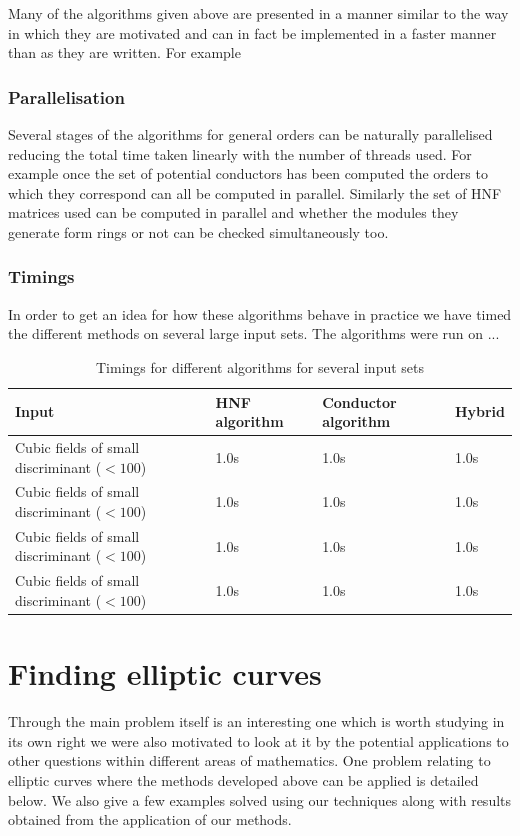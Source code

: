 \documentclass[12pt,a4paper,abstracton,bibtotoc]{scrreprt}
\theoremstyle{definition}
\begin{document}
Many of the algorithms given above are presented in a manner similar to the way in which they are motivated and can in fact be implemented in a faster manner than as they are written.
For example %

\subsection{Parallelisation}
Several stages of the algorithms for general orders can be naturally parallelised reducing the total time taken linearly with the number of threads used.
For example once the set of potential conductors has been computed the orders to which they correspond can all be computed in parallel.
Similarly the set of HNF matrices used can be computed in parallel and whether the modules they generate form rings or not can be checked simultaneously too.

\subsection{Timings}
In order to get an idea for how these algorithms behave in practice we have timed the different methods on several large input sets.
The algorithms were run on ...
\begin{table}[H]
\begin{tabular}{|p{14em}|l|l|l|}
\hline
Input & HNF algorithm & Conductor algorithm & Hybrid \\
\hline
Cubic fields of small discriminant ($< 100$) & 1.0s & 1.0s & 1.0s \\
Cubic fields of small discriminant ($< 100$) & 1.0s & 1.0s & 1.0s \\
Cubic fields of small discriminant ($< 100$) & 1.0s & 1.0s & 1.0s \\
Cubic fields of small discriminant ($< 100$) & 1.0s & 1.0s & 1.0s \\
\hline
\end{tabular}
\caption{\label{tab:timings} Timings for different algorithms for several input sets}
\end{table}


\chapter{Finding elliptic curves}
\label{chap:ellapp}
Through the main problem itself is an interesting one which is worth studying in its own right we were also motivated to look at it by the potential applications to other questions within different areas of mathematics.
One problem relating to elliptic curves where the methods developed above can be applied is detailed below.
We also give a few examples solved using our techniques along with results obtained from the application of our methods.
\end{document}
